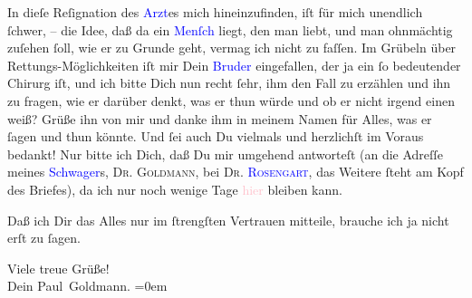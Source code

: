 \pstart
           In dieſe Reſignation des \textcolor{blue}{Arzt}{}\ledrightnote{{$\rightarrow$}\textcolor{blue}{Josef Rosengart}}es {\pb}mich hineinzufinden, iſt für mich
               unendlich ſchwer, – die Idee, daß da ein \textcolor{blue}{Menſch}{}\ledrightnote{{$\rightarrow$}\textcolor{blue}{Fedor Mamroth}} liegt, den man liebt, und man  ohnmächtig zuſehen ſoll, wie er zu Grunde geht, vermag ich nicht zu faſſen. Im
               Grübeln über Rettungs-Möglichkeiten iſt mir Dein \textcolor{blue}{Bruder}{}\ledrightnote{{$\rightarrow$}\textcolor{blue}{Julius Schnitzler}} eingefallen, der ja ein ſo bedeutender Chirurg iſt,
               und ich bitte Dich nun recht ſehr, ihm  den Fall zu erzählen und ihn zu fragen, wie er darüber denkt, was er thun
               würde und ob er nicht irgend einen \label{K-L03243-3v}\label{K-L03243-3h} weiß? Grüße ihn von mir und danke ihm in meinem Namen für Alles, was er ſagen
               und thun könnte. Und ſei auch Du vielmals und {\pb}herzlichſt im Voraus bedankt! Nur bitte ich Dich, daß Du mir umgehend antworteſt
               (an die Adreſſe meines \textcolor{blue}{Schwager}{}\ledrightnote{{$\rightarrow$}\textcolor{blue}{Josef Rosengart}}s, \textsc{Dr. Goldmann}, bei \textsc{Dr. }{ }\textsc{\textcolor{blue}{Rosengart}{}\ledrightnote{\textcolor{blue}{Josef Rosengart}}}, das Weitere ſteht am Kopf des Briefes), da ich nur noch wenige Tage \textcolor{pink}{hier}{}\ledrightnote{{$\rightarrow$}\textcolor{pink}{Frankfurt am Main}} bleiben kann.\pend
           
\pstart
           Daß ich Dir das Alles nur im ſtrengſten Vertrauen mitteile, brauche ich ja nicht erſt
               zu ſagen.\pend
           
\pstart
           Viele treue Grüße! {\\[\baselineskip]}Dein \spacefill\mbox{Paul Goldmann.}\pend
           \leftskip=0em{}\endnumbering{}  
      
